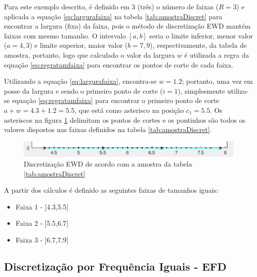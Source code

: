 Para este exemplo descrito, é definido em 3 (três) o número de faixas (${R=3}$) e aplicada a equação \ref{eq:largurafaixa} na tabela \ref{tab:amostraDiscret} para encontrar a largura (fixa) da faixa, pois o método de discretização EWD mantém faixas com mesmo tamanho. O intervalo ${[a,b]}$ seria o limite inferior, menor valor (${a=4,3}$) e limite superior, maior valor (${b=7,9}$), respectivamente, da tabela de amostra, portanto, logo que calculado o valor da largura ${w}$ é utilizada a regra da equação \ref{eq:regratamfaixa} para encontrar os pontos de corte de cada faixa.

Utilizando a equação \ref{eq:largurafaixa}, encontra-se ${w=1.2}$; portanto, uma vez em posse da largura e sendo o primeiro ponto de corte (${i=1}$), simplesmente utiliza-se equação \ref{eq:regratamfaixa} para encontrar o primeiro ponto de corte ${a+w = 4.3 + 1.2 = 5.5}$, que está como asterisco na posição ${c_1=5.5}$. Os asteriscos na figura \ref{fig:faixasFihseririsExemploEWD} delimitam os pontos de cortes e os pontinhos são todos os valores dispostos nas faixas definidos na tabela \ref{tab:amostraDiscret}.

\begin{figure}[h] 
        \centering
        \includegraphics[scale=0.8]{figs/ewd_fisheriris_col1.png}
        \caption{Discretização EWD de acordo com a amostra da tabela \ref{tab:amostraDiscret}}%
        \label{fig:faixasFihseririsExemploEWD}
\end{figure}

A partir dos cálculos é definido as seguintes faixas de tamanhos iguais:
\begin{itemize}[noitemsep]
 \item Faixa 1 - [4.3,5.5]
 \item Faixa 2 - ]5.5,6.7]
 \item Faixa 3 - ]6.7,7.9]
\end{itemize}


\subsection{Discretização por Frequência Iguais - EFD}\label{cap:refTeor:subsec:efd}

